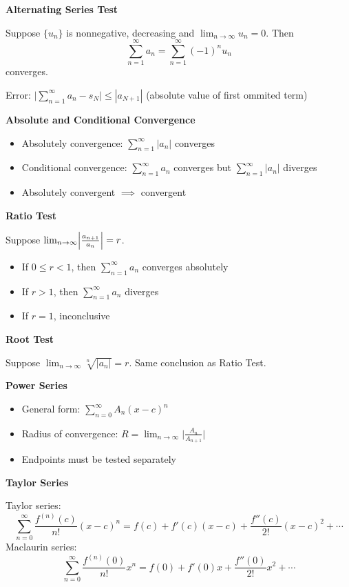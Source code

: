 \documentclass[10pt]{article}
\newcommand\sectionheading[1]{\begin{center}\large{\textbf{#1}}\end{center}\normalsize}
\newcommand\heading[1]{\smallskip\textbf{#1}\smallskip}
\begin{document}
\begin{multicols*}{3}
\heading{Alternating Series Test}

Suppose $\{u_n\}$ is nonnegative, decreasing and $\lim_{n\to\infty}u_n=0$. Then 
\[\sum_{n=1}^{\infty}a_n=\sum_{n=1}^{\infty}(-1)^n u_n\] 
converges.

Error: $\big|\sum_{n=1}^{\infty}a_n-s_N\big|\leq |a_{N+1}|$ (absolute value of first ommited term)

\heading{Absolute and Conditional Convergence}

\begin{itemize}[noitemsep,topsep=0pt]
    \item Absolutely convergence: $\sum_{n=1}^{\infty} |a_n|$ converges
    \item Conditional convergence: $\sum_{n=1}^{\infty} a_n$ converges but $\sum_{n=1}^{\infty} |a_n|$ diverges 
    \item Absolutely convergent $\implies$ convergent
\end{itemize}

\heading{Ratio Test}

Suppose $\lim_{n\to\infty}\Bigl|\frac{a_{n+1}}{a_n}\Bigr|=r$.
\begin{itemize}[noitemsep,topsep=0pt]
    \item If $0\leq r<1$, then $\sum_{n=1}^{\infty} a_n$ converges absolutely 
    \item If $r>1$, then $\sum_{n=1}^{\infty} a_n$ diverges 
    \item If $r=1$, inconclusive
\end{itemize}

\heading{Root Test}

Suppose $\lim_{n\to\infty}\sqrt[n]{|a_n|}=r$. Same conclusion as Ratio Test.

\sectionheading{Power Series}

\begin{itemize}[noitemsep,topsep=0pt]
    \item General form: $\sum_{n=0}^{\infty}A_n (x-c)^n$
    \item Radius of convergence: $R=\lim_{n\to\infty}\Big|\frac{A_n}{A_{n+1}}\Big|$
    \item Endpoints must be tested separately
\end{itemize}

\sectionheading{Taylor Series}
Taylor series:
{\small
\[\sum_{n=0}^\infty \frac{f^{(n)}(c)}{n!}(x-c)^n=f(c)+f'(c)(x-c)+\frac{f''(c)}{2!}(x-c)^2+\cdots\]}
Maclaurin series:
\[\sum_{n=0}^\infty \frac{f^{(n)}(0)}{n!}x^n=f(0)+f'(0)x+\frac{f''(0)}{2!}x^2+\cdots\]


\end{multicols*}
\end{document}
